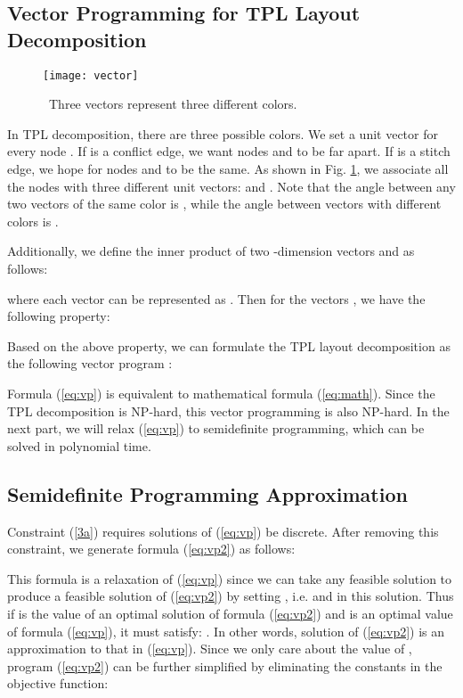 \documentclass[10pt,conference]{IEEEtran}
\begin{document}
\subsection{Vector Programming for TPL Layout Decomposition}

\begin{figure}[tb]
	\centering
	\texttt{[image: vector]}
\caption{~Three vectors  represent three different colors.}
	\label{fig:vector}
\end{figure}

In TPL decomposition, there are three possible colors.
We set a unit vector  for every node .
If  is a conflict edge, we want nodes  and  to be far apart.
If  is a stitch edge, we hope for nodes  and  to be the same.
As shown in Fig. \ref{fig:vector}, we associate all the nodes with three different unit vectors:  and .
Note that the angle between any two vectors of the same color is , while the angle between vectors with different colors is .

Additionally, we define the inner product of two -dimension vectors  and  as follows:

where each vector  can be represented as .
Then for the vectors , we have the following  property:




Based on the above property, we can formulate the TPL layout decomposition as the following vector program \cite{approx_book2011}:



Formula (\ref{eq:vp}) is equivalent to mathematical formula (\ref{eq:math}).
Since the TPL decomposition is NP-hard, this vector programming is also NP-hard.
In the next part, we will relax (\ref{eq:vp}) to semidefinite programming, which can be solved in polynomial time. 



\subsection{Semidefinite Programming Approximation}

Constraint (\ref{3a}) requires solutions of (\ref{eq:vp}) be discrete.
After removing this constraint, we generate formula (\ref{eq:vp2}) as follows:


This formula is a relaxation of (\ref{eq:vp}) since we can take any feasible solution  to produce a feasible solution of (\ref{eq:vp2}) by setting , i.e.  and  in this solution. Thus if  is the value of an optimal solution of formula (\ref{eq:vp2}) and  is an optimal value of formula (\ref{eq:vp}), it must satisfy: .
In other words, solution of (\ref{eq:vp2}) is an approximation to that in (\ref{eq:vp}).
Since we only care about the value of , program (\ref{eq:vp2}) can be further simplified by eliminating the constants in the objective function:
\end{document}
